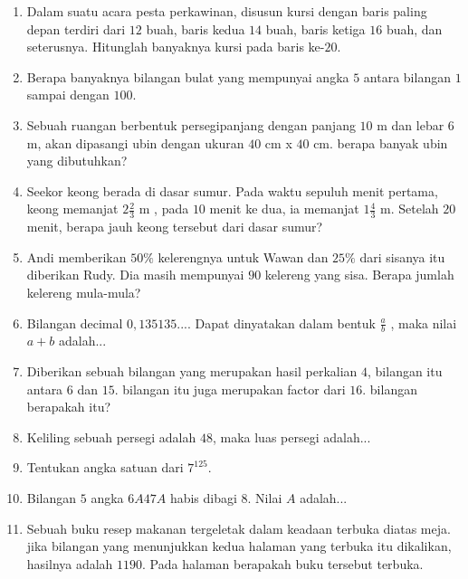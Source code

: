 \documentclass[12pt]{scrartcl}
\begin{document}
\begin{enumerate}
\item Dalam suatu acara pesta perkawinan, disusun kursi dengan baris paling depan terdiri dari $12$ buah, baris kedua $14$ buah, baris ketiga $16$ buah, dan seterusnya. Hitunglah banyaknya kursi pada baris ke-$20$.
\item Berapa banyaknya bilangan bulat yang mempunyai angka $5$ antara bilangan $1$ sampai dengan $100$.
\item Sebuah ruangan berbentuk persegipanjang dengan panjang $10$ m dan lebar $6$ m, akan dipasangi ubin dengan ukuran $40$ cm x $40$ cm. berapa banyak ubin yang dibutuhkan?
\item Seekor keong berada di dasar sumur. Pada waktu sepuluh menit pertama, keong memanjat $2 \frac{2}{3}$ m , pada $10$ menit ke dua, ia memanjat $1 \frac{4}{3}$ m. Setelah $20$ menit, berapa jauh keong tersebut dari dasar sumur?
\item Andi memberikan $50\%$ kelerengnya untuk Wawan dan $25\%$ dari sisanya itu diberikan Rudy. Dia masih mempunyai $90$ kelereng yang sisa. Berapa jumlah kelereng mula-mula?
\item Bilangan decimal $0,135135....$ Dapat dinyatakan dalam bentuk $\frac{a}{b}$ , maka nilai $a+b$ adalah...
\item Diberikan sebuah bilangan yang merupakan hasil perkalian $4$, bilangan itu antara $6$ dan $15$. bilangan itu juga merupakan factor dari $16$. bilangan berapakah itu?
\item Keliling sebuah persegi adalah $48$, maka luas persegi adalah...
\item Tentukan angka satuan dari $7^{125}$.
\item Bilangan $5$ angka $6A47A$ habis dibagi $8$. Nilai $A$ adalah...
\item Sebuah buku resep makanan tergeletak dalam keadaan terbuka diatas meja.
jika bilangan yang menunjukkan kedua halaman yang terbuka itu dikalikan, hasilnya adalah $1190$. Pada halaman berapakah buku tersebut terbuka.


\end{enumerate}
\end{document}
